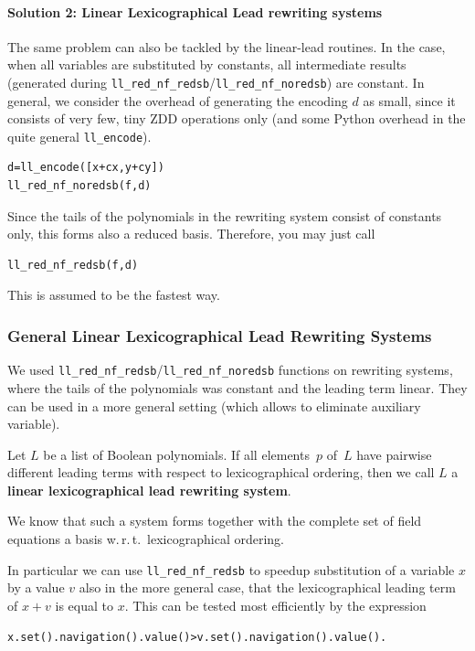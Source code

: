 \paragraph{Solution 2: Linear Lexicographical Lead rewriting systems}
The same problem can also be tackled by the linear-lead routines. In the case, when
all variables are substituted by  constants, all intermediate results
(generated during \lstinline|ll_red_nf_redsb|/\lstinline|ll_red_nf_noredsb|) are constant.
In general, we consider the overhead of generating the encoding $d$ as small, 
since it consists of very few, tiny ZDD operations only (and some Python overhead in the quite general \lstinline|ll_encode|).
\begin{lstlisting}
d=ll_encode([x+cx,y+cy])
ll_red_nf_noredsb(f,d)
\end{lstlisting}
%
%
Since the tails of the polynomials in the rewriting system   consist of
constants only, this forms also a
reduced \Groebner basis. Therefore, you may just call
\begin{lstlisting}
ll_red_nf_redsb(f,d)   
\end{lstlisting}
%
This is assumed to be the fastest way.
%


\subsubsection{General Linear Lexicographical Lead Rewriting Systems}
\label{linear-lexicographical-lead-rewriting-systems}
We used \lstinline|ll_red_nf_redsb|/\lstinline|ll_red_nf_noredsb| functions on rewriting systems, where the tails of the polynomials was constant and the leading term linear.
They can be used in a more general setting (which allows to eliminate auxiliary variable).
\begin{definition}
Let $L$ be a list of Boolean polynomials.
If all elements~$p$ of~$L$ have pairwise different leading terms with respect to lexicographical ordering,
then we call $L$ a \textbf{linear lexicographical lead rewriting system}.
\end{definition}
We know that such a system forms together with the complete set of field
equations a \Groebner basis w.\,r.\,t.\ lexicographical ordering.

In particular we can use \lstinline|ll_red_nf_redsb| to speedup substitution of a variable $x$ by a value $v$ also in the more general case, that the lexicographical leading term of $x+v$ is equal to $x$.
This can be tested most efficiently by the expression
\begin{lstlisting}
x.set().navigation().value()>v.set().navigation().value().
\end{lstlisting}

